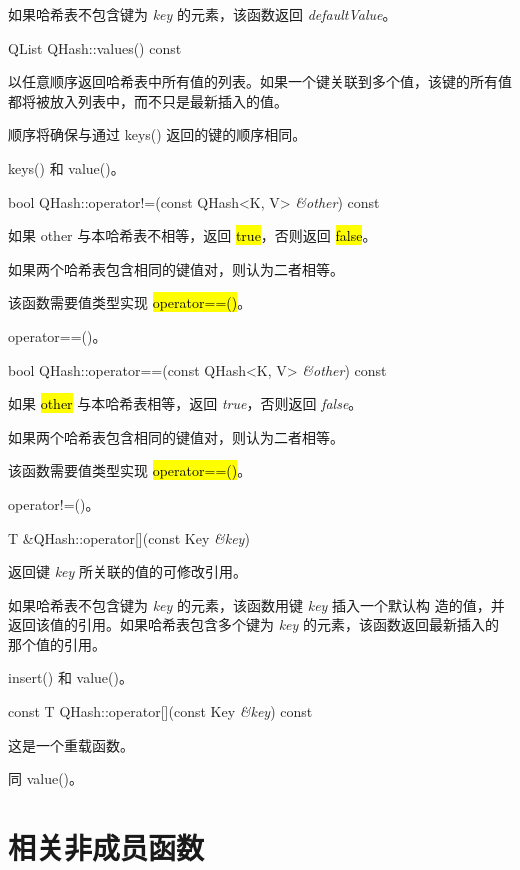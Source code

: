 如果哈希表不包含键为 \emph{key} 的元素，该函数返回 \emph{defaultValue}。

QList QHash::values() const

以任意顺序返回哈希表中所有值的列表。如果一个键关联到多个值，该键的所有值都将被放入列表中，而不只是最新插入的值。

顺序将确保与通过 keys() 返回的键的顺序相同。

\begin{seeAlso}
keys() 和 value()。
\end{seeAlso}



bool QHash::operator!=(const QHash<K, V> \emph{\&other}) const

如果 other 与本哈希表不相等，返回 \hl{true}，否则返回 \hl{false}。

如果两个哈希表包含相同的键值对，则认为二者相等。

该函数需要值类型实现 \hl{operator==()}。

\begin{seeAlso}
operator==()。
\end{seeAlso}


bool QHash::operator==(const QHash<K, V> \emph{\&other}) const

如果 \hl{other} 与本哈希表相等，返回 \emph{true}，否则返回 \emph{false}。

如果两个哈希表包含相同的键值对，则认为二者相等。

该函数需要值类型实现 \hl{operator==()}。

\begin{seeAlso}
operator!=()。
\end{seeAlso}

T \&QHash::operator[](const Key \emph{\&key})

返回键 \emph{key} 所关联的值的可修改引用。

如果哈希表不包含键为 \emph{key} 的元素，该函数用键 \emph{key} 插入一个默认构
造的值，并返回该值的引用。如果哈希表包含多个键为 \emph{key} 的元素，该函数返回最新插入的那个值的引用。

\begin{seeAlso}
insert() 和 value()。
\end{seeAlso}


const T QHash::operator[](const Key \emph{\&key}) const

这是一个重载函数。

同 value()。

\section{相关非成员函数}

